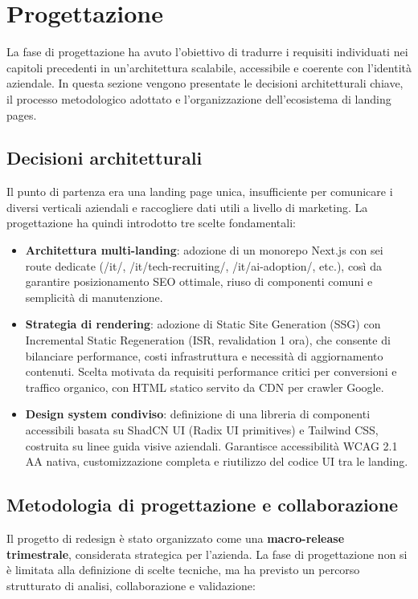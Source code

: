 \chapter{Progettazione}

La fase di progettazione ha avuto l'obiettivo di tradurre i requisiti individuati
nei capitoli precedenti in un'architettura scalabile, accessibile e coerente con
l'identità aziendale. In questa sezione vengono presentate le decisioni
architetturali chiave, il processo metodologico adottato e l'organizzazione
dell'ecosistema di landing pages.

\section{Decisioni architetturali}
Il punto di partenza era una landing page unica, insufficiente per comunicare i
diversi verticali aziendali e raccogliere dati utili a livello di marketing. La
progettazione ha quindi introdotto tre scelte fondamentali:

\begin{itemize}
  \item \textbf{Architettura multi-landing}: adozione di un monorepo Next.js con sei
  route dedicate (/it/, /it/tech-recruiting/, /it/ai-adoption/, etc.), così da garantire 
  posizionamento SEO ottimale, riuso di componenti comuni e semplicità di manutenzione. 
  
  \item \textbf{Strategia di rendering}: adozione di Static Site Generation (SSG) 
  con Incremental Static Regeneration (ISR, revalidation 1 ora), che consente di 
  bilanciare performance, costi infrastruttura e 
  necessità di aggiornamento contenuti. Scelta motivata da requisiti performance 
  critici per conversioni e traffico organico, con HTML statico servito da CDN 
  per crawler Google.
  
  \item \textbf{Design system condiviso}: definizione di una libreria di componenti 
  accessibili basata su ShadCN UI (Radix UI primitives) e Tailwind CSS, costruita 
  su linee guida visive aziendali. Garantisce accessibilità WCAG 2.1 AA nativa, 
  customizzazione completa e riutilizzo del codice UI tra le landing.
\end{itemize}

\section{Metodologia di progettazione e collaborazione} Il progetto di redesign è stato organizzato come una \textbf{macro-release trimestrale},
considerata strategica per l'azienda. La fase di progettazione non si è limitata
alla definizione di scelte tecniche, ma ha previsto un percorso strutturato di
analisi, collaborazione e validazione:

